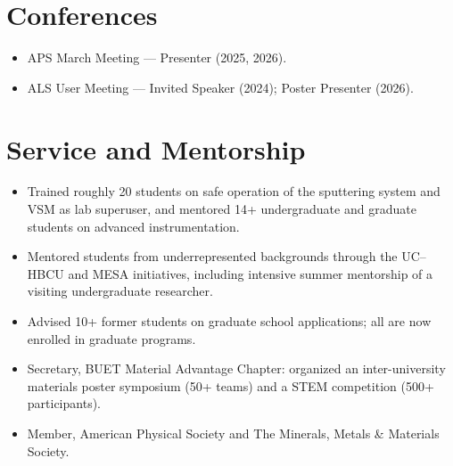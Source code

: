 \documentclass[10pt,letterpaper]{article}
\begin{document}
\section{Conferences}
\begin{itemize}
  \item APS March Meeting --- Presenter (2025, 2026).
  \item ALS User Meeting --- Invited Speaker (2024); Poster Presenter (2026).
\end{itemize}

\section{Service and Mentorship}
\begin{itemize}
  \item Trained roughly 20 students on safe operation of the sputtering system and VSM as lab
        superuser, and mentored 14+ undergraduate and graduate students on advanced instrumentation.
  \item Mentored students from underrepresented backgrounds through the UC--HBCU and MESA
        initiatives, including intensive summer mentorship of a visiting undergraduate researcher.
  \item Advised 10+ former students on graduate school applications; all are now enrolled in
        graduate programs.
  \item Secretary, BUET Material Advantage Chapter: organized an inter-university materials poster
        symposium (50+ teams) and a STEM competition (500+ participants).
  \item Member, American Physical Society and The Minerals, Metals \& Materials Society.
\end{itemize}
\end{document}

